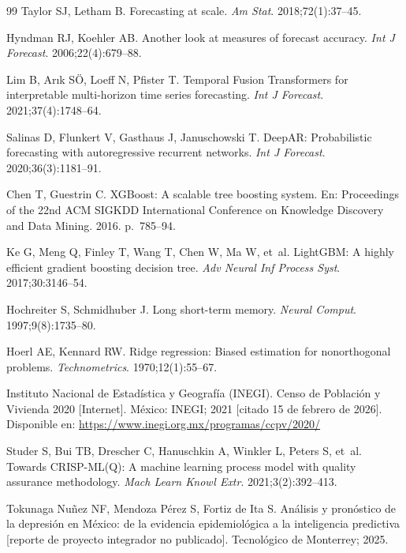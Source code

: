 \documentclass[12pt,a4paper]{article}
\begin{document}
\begin{thebibliography}{99}
Taylor SJ, Letham B.
Forecasting at scale.
\textit{Am Stat}. 2018;72(1):37--45.

Hyndman RJ, Koehler AB.
Another look at measures of forecast accuracy.
\textit{Int J Forecast}. 2006;22(4):679--88.

Lim B, Arık SÖ, Loeff N, Pfister T.
Temporal Fusion Transformers for interpretable multi-horizon time series forecasting.
\textit{Int J Forecast}. 2021;37(4):1748--64.

Salinas D, Flunkert V, Gasthaus J, Januschowski T.
DeepAR: Probabilistic forecasting with autoregressive recurrent networks.
\textit{Int J Forecast}. 2020;36(3):1181--91.

Chen T, Guestrin C.
XGBoost: A scalable tree boosting system.
En: Proceedings of the 22nd ACM SIGKDD International Conference on Knowledge Discovery and Data Mining. 2016. p.~785--94.

Ke G, Meng Q, Finley T, Wang T, Chen W, Ma W, et~al.
LightGBM: A highly efficient gradient boosting decision tree.
\textit{Adv Neural Inf Process Syst}. 2017;30:3146--54.

Hochreiter S, Schmidhuber J.
Long short-term memory.
\textit{Neural Comput}. 1997;9(8):1735--80.

Hoerl AE, Kennard RW.
Ridge regression: Biased estimation for nonorthogonal problems.
\textit{Technometrics}. 1970;12(1):55--67.

Instituto Nacional de Estadística y Geografía (INEGI).
Censo de Población y Vivienda 2020 [Internet]. México: INEGI; 2021 [citado 15 de febrero de 2026]. Disponible en: \url{https://www.inegi.org.mx/programas/ccpv/2020/}

Studer S, Bui TB, Drescher C, Hanuschkin A, Winkler L, Peters S, et~al.
Towards CRISP-ML(Q): A machine learning process model with quality assurance methodology.
\textit{Mach Learn Knowl Extr}. 2021;3(2):392--413.

Tokunaga Nuñez NF, Mendoza Pérez S, Fortiz de Ita S.
Análisis y pronóstico de la depresión en México: de la evidencia epidemiológica a la inteligencia predictiva [reporte de proyecto integrador no publicado].
Tecnológico de Monterrey; 2025.

\end{thebibliography}
\end{document}
